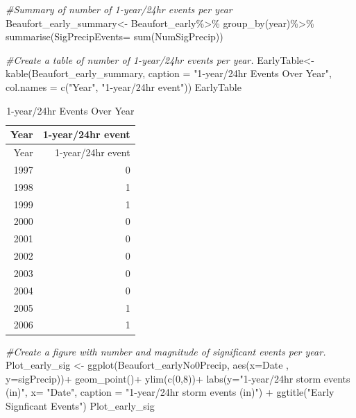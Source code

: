 \documentclass[
  12pt,
]{article}
\newenvironment{Shaded}{\begin{snugshade}}{\end{snugshade}}
\newcommand{\AttributeTok}[1]{\textcolor[rgb]{0.77,0.63,0.00}{#1}}
\newcommand{\CommentTok}[1]{\textcolor[rgb]{0.56,0.35,0.01}{\textit{#1}}}
\newcommand{\DecValTok}[1]{\textcolor[rgb]{0.00,0.00,0.81}{#1}}
\newcommand{\FunctionTok}[1]{\textcolor[rgb]{0.00,0.00,0.00}{#1}}
\newcommand{\NormalTok}[1]{#1}
\newcommand{\OtherTok}[1]{\textcolor[rgb]{0.56,0.35,0.01}{#1}}
\newcommand{\SpecialCharTok}[1]{\textcolor[rgb]{0.00,0.00,0.00}{#1}}
\newcommand{\StringTok}[1]{\textcolor[rgb]{0.31,0.60,0.02}{#1}}
\begin{document}
\begin{Shaded}
\begin{Highlighting}[]
\CommentTok{\#Summary of number of 1{-}year/24hr events per year}
\NormalTok{Beaufort\_early\_summary}\OtherTok{\textless{}{-}}\NormalTok{ Beaufort\_early}\SpecialCharTok{\%\textgreater{}\%}
  \FunctionTok{group\_by}\NormalTok{(year)}\SpecialCharTok{\%\textgreater{}\%}
  \FunctionTok{summarise}\NormalTok{(}\AttributeTok{SigPrecipEvents=} \FunctionTok{sum}\NormalTok{(NumSigPrecip))}

\CommentTok{\#Create a table of number of 1{-}year/24hr events per year.}
\NormalTok{EarlyTable}\OtherTok{\textless{}{-}} \FunctionTok{kable}\NormalTok{(Beaufort\_early\_summary, }\AttributeTok{caption =} \StringTok{"1{-}year/24hr Events Over Year"}\NormalTok{, }\AttributeTok{col.names =} \FunctionTok{c}\NormalTok{(}\StringTok{"Year"}\NormalTok{, }\StringTok{"1{-}year/24hr event"}\NormalTok{))}
\NormalTok{EarlyTable}
\end{Highlighting}
\end{Shaded}

\begin{longtable}[]{@{}rr@{}}
\caption{1-year/24hr Events Over Year}\tabularnewline
\toprule
Year & 1-year/24hr event \\
\midrule
\endfirsthead
\toprule
Year & 1-year/24hr event \\
\midrule
\endhead
1997 & 0 \\
1998 & 1 \\
1999 & 1 \\
2000 & 0 \\
2001 & 0 \\
2002 & 0 \\
2003 & 0 \\
2004 & 0 \\
2005 & 1 \\
2006 & 1 \\
\bottomrule
\end{longtable}

\begin{Shaded}
\begin{Highlighting}[]
\CommentTok{\#Create a figure with number and magnitude of significant events per year.}
\NormalTok{Plot\_early\_sig }\OtherTok{\textless{}{-}} \FunctionTok{ggplot}\NormalTok{(Beaufort\_earlyNo0Precip, }\FunctionTok{aes}\NormalTok{(}\AttributeTok{x=}\NormalTok{Date , }\AttributeTok{y=}\NormalTok{sigPrecip))}\SpecialCharTok{+}
  \FunctionTok{geom\_point}\NormalTok{()}\SpecialCharTok{+}
  \FunctionTok{ylim}\NormalTok{(}\FunctionTok{c}\NormalTok{(}\DecValTok{0}\NormalTok{,}\DecValTok{8}\NormalTok{))}\SpecialCharTok{+}
  \FunctionTok{labs}\NormalTok{(}\AttributeTok{y=}\StringTok{"1{-}year/24hr storm events (in)"}\NormalTok{, }\AttributeTok{x=} \StringTok{"Date"}\NormalTok{, }\AttributeTok{caption =} \StringTok{"1{-}year/24hr storm events (in)"}\NormalTok{) }\SpecialCharTok{+}
  \FunctionTok{ggtitle}\NormalTok{(}\StringTok{"Early Signficant Events"}\NormalTok{)}
\NormalTok{Plot\_early\_sig}
\end{Highlighting}
\end{Shaded}
\end{document}
